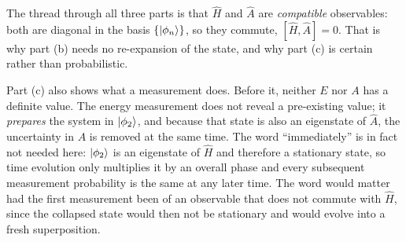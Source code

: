 \documentclass[12pt]{article}
\begin{document}
\begin{insightbox}
The thread through all three parts is that $\hat{H}$ and $\hat{A}$ are \emph{compatible} observables: both are diagonal in the basis $\{\ket{\phi_{n}}\}$, so they commute, $[\hat{H},\hat{A}]=0$. That is why part (b) needs no re-expansion of the state, and why part (c) is certain rather than probabilistic.

Part (c) also shows what a measurement does. Before it, neither $E$ nor $A$ has a definite value. The energy measurement does not reveal a pre-existing value; it \emph{prepares} the system in $\ket{\phi_{2}}$, and because that state is also an eigenstate of $\hat{A}$, the uncertainty in $A$ is removed at the same time. The word ``immediately'' is in fact not needed here: $\ket{\phi_{2}}$ is an eigenstate of $\hat{H}$ and therefore a stationary state, so time evolution only multiplies it by an overall phase and every subsequent measurement probability is the same at any later time. The word would matter had the first measurement been of an observable that does not commute with $\hat{H}$, since the collapsed state would then not be stationary and would evolve into a fresh superposition.
\end{insightbox}
\fi
\end{document}

